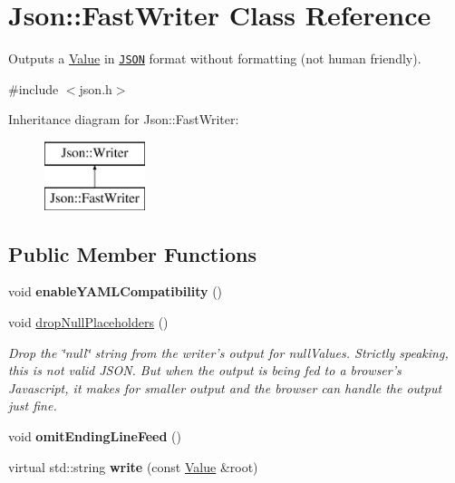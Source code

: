 \hypertarget{class_json_1_1_fast_writer}{\section{Json\+:\+:Fast\+Writer Class Reference}
\label{class_json_1_1_fast_writer}
}


Outputs a \hyperlink{class_json_1_1_value}{Value} in \href{http://www.json.org}{\tt J\+S\+O\+N} format without formatting (not human friendly).  




{\ttfamily \#include $<$json.\+h$>$}

Inheritance diagram for Json\+:\+:Fast\+Writer\+:\begin{figure}[H]
\begin{center}
\leavevmode
\includegraphics[height=2.000000cm]{class_json_1_1_fast_writer}
\end{center}
\end{figure}
\subsection*{Public Member Functions}
\begin{DoxyCompactItemize}
\item 
\hypertarget{class_json_1_1_fast_writer_a78d98e9f76d33660ad6e6a1abe287d45}{void {\bfseries enable\+Y\+A\+M\+L\+Compatibility} ()}\label{class_json_1_1_fast_writer_a78d98e9f76d33660ad6e6a1abe287d45}

\item 
\hypertarget{class_json_1_1_fast_writer_a6e93d8dce951e408517311026a065b40}{void \hyperlink{class_json_1_1_fast_writer_a6e93d8dce951e408517311026a065b40}{drop\+Null\+Placeholders} ()}\label{class_json_1_1_fast_writer_a6e93d8dce951e408517311026a065b40}

\begin{DoxyCompactList}\small\item\em Drop the \char`\"{}null\char`\"{} string from the writer's output for null\+Values. Strictly speaking, this is not valid J\+S\+O\+N. But when the output is being fed to a browser's Javascript, it makes for smaller output and the browser can handle the output just fine. \end{DoxyCompactList}\item 
\hypertarget{class_json_1_1_fast_writer_af4ee077d365d75941fb2688d97207a55}{void {\bfseries omit\+Ending\+Line\+Feed} ()}\label{class_json_1_1_fast_writer_af4ee077d365d75941fb2688d97207a55}

\item 
\hypertarget{class_json_1_1_fast_writer_a0f64b9e1fce6b743aad3f100cfc33427}{virtual std\+::string {\bfseries write} (const \hyperlink{class_json_1_1_value}{Value} \&root)}\label{class_json_1_1_fast_writer_a0f64b9e1fce6b743aad3f100cfc33427}

\end{DoxyCompactItemize}


